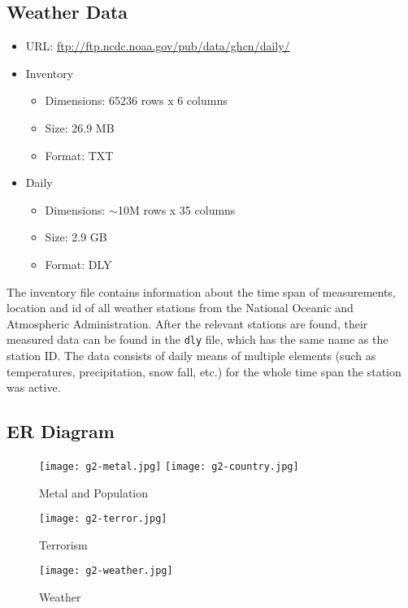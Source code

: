 \subsection{Weather Data}
\begin{itemize}
	\item URL: \url{ftp://ftp.ncdc.noaa.gov/pub/data/ghcn/daily/}
	\item Inventory
	\begin{itemize}
	  \item Dimensions: 65236 rows x 6 columns
	  \item Size: 26.9 MB
	  \item Format: TXT
    \end{itemize}
	\item Daily
	\begin{itemize}
	  \item Dimensions: $\sim$10M rows x 35 columns
	  \item Size: 2.9 GB
	  \item Format: DLY
    \end{itemize}
\end{itemize}

The inventory file contains information about the time span of measurements, location and id of all weather stations from the National Oceanic and Atmospheric Administration. After the relevant stations are found, their measured data can be found in the \texttt{dly} file, which has the same name as the station ID. The data consists of daily means of multiple elements (such as temperatures, precipitation, snow fall, etc.) for the whole time span the station was active.

\subsection{ER Diagram}
\begin{figure}[hbt!]
    \texttt{[image: g2-metal.jpg]}
    \texttt{[image: g2-country.jpg]}
    \caption{Metal and Population}
\label{fig:singlesource}
\end{figure}

\begin{figure}[hbt!]
    \centering
    \texttt{[image: g2-terror.jpg]}
    \caption{Terrorism}
\label{fig:singlesource}
\end{figure}

\begin{figure}[hbt!]
    \centering
    \texttt{[image: g2-weather.jpg]}
    \caption{Weather}
\label{fig:singlesource}
\end{figure}


